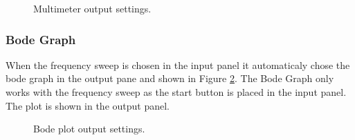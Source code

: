 \begin{figure}[H]
\centering
{}
\caption{Multimeter output settings.}
\label{fig:multi}
\end{figure}

\subsubsection*{Bode Graph}
When the frequency sweep is chosen in the input panel it automaticaly chose the bode graph in the output pane and shown in Figure \ref{fig:bode}. The Bode Graph only works with the frequency sweep as the start button is placed in the input panel. The plot is shown in the output panel.

\begin{figure}[H]
\centering
{}
\caption{Bode plot output settings.}
\label{fig:bode}
\end{figure}


\ifdefined\master
\else
	
\fi